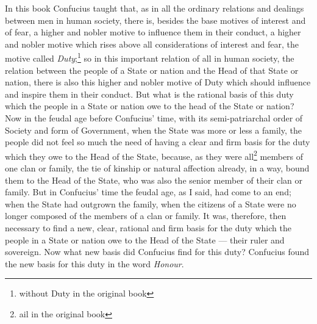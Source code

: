 \vspace{0.5cm}
In this book Confucius taught that, as in all the ordinary relations and dealings between men in human society, there is, besides the base motives of interest and of fear, a higher and nobler motive to influence them in their conduct, a higher and nobler motive which rises above all considerations of interest and fear, the motive called \emph{Duty};\footnote{without Duty in the original book} so in this important relation of all in human society, the relation between the people of a State or nation and the Head of that State or nation, there is also this higher and nobler motive of Duty which should influence and inspire them in their conduct.
But what is the rational basis of this duty which the people in a State or nation owe to the head of the State or nation?
Now in the feudal age before Confucius' time, with its semi-patriarchal order of Society and form of Government, when the State was more or less a family, the people did not feel so much the need of having a clear and firm basis for the duty which they owe to the Head of the State, because, as they were all\footnote{ail in the original book} members of one clan or family, the tie of kinship or natural affection already, in a way, bound them to the Head of the State, who was also the senior member of their clan or family.
But in Confucius' time the feudal age, as I said, had come to an end;
when the State had outgrown the family, when the citizens of a State were no longer composed of the members of a clan or family.
It was, therefore, then necessary to find a new, clear, rational and firm basis for the duty which the people in a State or nation owe to the Head of the State --- their ruler and sovereign.
Now what new basis did Confucius find for this duty?
Confucius found the new basis for this duty in the word \emph{Honour}.

